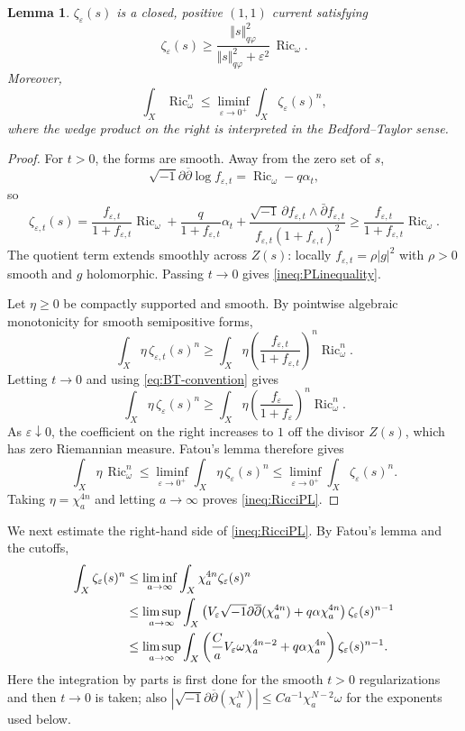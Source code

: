 \documentclass[11pt]{amsart}
\numberwithin{equation}{section}
\newcommand{\Ric}{\operatorname{Ric}}
\newcommand{\vep}{\varepsilon}
\renewcommand{\d}{\partial}
\newcommand{\ddbar}{\sqrt{-1}\d\overline{\d}}
\theoremstyle{plain}
\newtheorem{lemma}[theorem]{Lemma}
\theoremstyle{remark}
\begin{document}
\begin{lemma}\label{lem:PL}
$\zeta_\vep(s)$ is a closed, positive $(1,1)$ current satisfying
\begin{equation}\label{ineq:PLinequality}
\zeta_\vep(s)\geq
        \frac{\Vert s\Vert_{q\varphi}^2}{\Vert s\Vert_{q\varphi}^2+\vep^2}\,\Ric_\omega .
\end{equation}
Moreover,
\begin{equation}\label{ineq:RicciPL}
        \int_X\Ric_\omega^n
        \leq
        \liminf_{\vep\to0^+}\int_X\zeta_\vep(s)^n,
\end{equation}
where the wedge product on the right is interpreted in the Bedford--Taylor sense.
\end{lemma}

\begin{proof}
For $t>0$, the forms are smooth.  Away from the zero set of $s$,
\[
        \ddbar\log f_{\vep,t}=\Ric_\omega-q\alpha_t,
\]
so
\[
\zeta_{\vep,t}(s)
 =\frac{f_{\vep,t}}{1+f_{\vep,t}}\Ric_\omega
 +\frac{q}{1+f_{\vep,t}}\alpha_t
 +\frac{\sqrt{-1}\,\partial f_{\vep,t}\wedge\bar\partial f_{\vep,t}}
        {f_{\vep,t}(1+f_{\vep,t})^2}
 \geq
 \frac{f_{\vep,t}}{1+f_{\vep,t}}\Ric_\omega .
\]
The quotient term extends smoothly across $Z(s)$: locally $f_{\vep,t}=\rho |g|^2$ with $\rho>0$ smooth and $g$ holomorphic.  Passing $t\to0$ gives \eqref{ineq:PLinequality}.

Let $\eta\ge0$ be compactly supported and smooth.  By pointwise algebraic monotonicity for smooth semipositive forms,
\[
\int_X\eta\,\zeta_{\vep,t}(s)^n
\geq
\int_X\eta\left(\frac{f_{\vep,t}}{1+f_{\vep,t}}\right)^n\Ric_\omega^n .
\]
Letting $t\to0$ and using \eqref{eq:BT-convention} gives
\[
\int_X\eta\,\zeta_\vep(s)^n
\geq
\int_X\eta\left(\frac{f_\vep}{1+f_\vep}\right)^n\Ric_\omega^n .
\]
As $\vep\downarrow0$, the coefficient on the right increases to $1$ off the divisor $Z(s)$, which has zero Riemannian measure.  Fatou's lemma therefore gives
\[
\int_X\eta\,\Ric_\omega^n
\leq
\liminf_{\vep\to0^+}\int_X\eta\,\zeta_\vep(s)^n
\leq
\liminf_{\vep\to0^+}\int_X\zeta_\vep(s)^n .
\]
Taking $\eta=\chi_a^{4n}$ and letting $a\to\infty$ proves \eqref{ineq:RicciPL}.
\end{proof}

We next estimate the right-hand side of \eqref{ineq:RicciPL}.  By Fatou's lemma and the cutoffs,
\begin{align}
\int_X\zeta_\vep(s)^n
&\leq \liminf_{a\to\infty}\int_X\chi_a^{4n}\zeta_\vep(s)^n                                      \notag\\
&\leq \limsup_{a\to\infty}\int_X
        \left(V_\vep\ddbar(\chi_a^{4n})+q\alpha\chi_a^{4n}\right)
        \zeta_\vep(s)^{n-1}                                                   \notag\\
&\leq \limsup_{a\to\infty}\int_X
        \left(\frac{C}{a}V_\vep\omega\chi_a^{4n-2}+q\alpha\chi_a^{4n}\right)
        \zeta_\vep(s)^{n-1}.\label{eq:firstexpansionofzeta}
\end{align}
Here the integration by parts is first done for the smooth $t>0$ regularizations and then $t\to0$ is taken; also
$|\ddbar(\chi_a^N)|\leq Ca^{-1}\chi_a^{N-2}\omega$ for the exponents used below.
\end{document}
